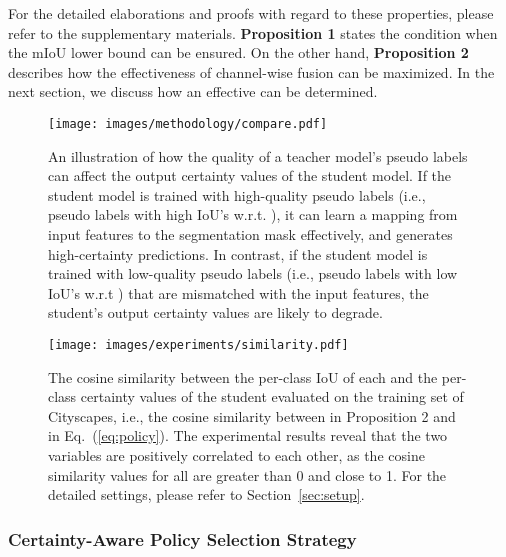 \documentclass[final]{cvpr}
\begin{document}
For the detailed elaborations and proofs with regard to these properties, please refer to the supplementary materials. \textbf{Proposition 1} states the condition when the mIoU lower bound can be ensured. On the other hand, \textbf{Proposition 2} describes how the effectiveness of channel-wise fusion can be maximized. In the next section, we discuss how an effective  can be determined.

\begin{figure}[t]
\texttt{[image: images/methodology/compare.pdf]}
    \caption{An illustration of how the quality of a teacher model's pseudo labels can affect the output certainty values of the student model. If the student model is trained with high-quality pseudo labels (i.e., pseudo labels with high IoU's w.r.t. ), it can learn a mapping from input features to the segmentation mask effectively, and generates high-certainty predictions. In contrast, if the student model is trained with low-quality pseudo labels (i.e., pseudo labels with low IoU's w.r.t ) that are mismatched with the input features, the student's output certainty values are likely to degrade.}
    \label{fig:compare}
\end{figure}
 \begin{figure}[t]
    \texttt{[image: images/experiments/similarity.pdf]}
    \caption{The cosine similarity between the per-class IoU of each  and the per-class certainty values of the student evaluated on the training set of Cityscapes, i.e., the cosine similarity between  in Proposition 2 and  in Eq.~(\ref{eq:policy}). The experimental results reveal that the two variables are positively correlated to each other, as the cosine similarity values for all  are greater than 0 and close to 1. For the detailed settings, please refer to Section~\ref{sec:setup}.}
    \label{fig:similarity}
\end{figure} \subsubsection{Certainty-Aware Policy Selection Strategy}
\label{subsubsec::certainty-aware-policy}
\end{document}
